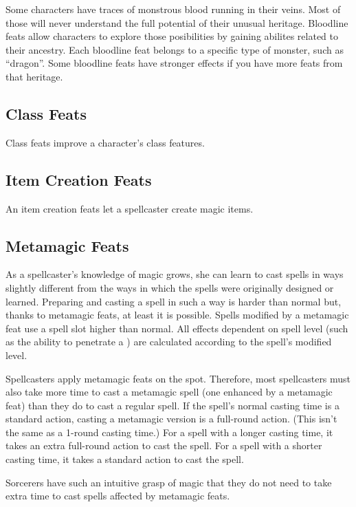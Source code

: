 Some characters have traces of monstrous blood running in their veins.
Most of those will never understand the full potential of their unusual heritage.
Bloodline feats allow characters to explore those posibilities by gaining abilites related to their ancestry.
Each bloodline feat belongs to a specific type of monster, such as ``dragon''.
Some bloodline feats have stronger effects if you have more feats from that heritage.

\subsection{Class Feats}
Class feats improve a character's class features.

\subsection{Item Creation Feats}
An item creation feats let a spellcaster create magic items.

\subsection{Metamagic Feats}
As a spellcaster's knowledge of magic grows, she can learn to cast spells in ways slightly different from the ways in which the spells were originally designed or learned.
Preparing and casting a spell in such a way is harder than normal but, thanks to metamagic feats, at least it is possible.
Spells modified by a metamagic feat use a spell slot higher than normal.
All effects dependent on spell level (such as the ability to penetrate a ) are calculated according to the spell's modified level.

Spellcasters apply metamagic feats on the spot.
Therefore, most spellcasters must also take more time to cast a metamagic spell (one enhanced by a metamagic feat) than they do to cast a regular spell.
If the spell's normal casting time is a standard action, casting a metamagic version is a full-round action.
(This isn't the same as a 1-round casting time.) For a spell with a longer casting time, it takes an extra full-round action to cast the spell.
For a spell with a shorter casting time, it takes a standard action to cast the spell.

\par Sorcerers have such an intuitive grasp of magic that they do not need to take extra time to cast spells affected by metamagic feats.

